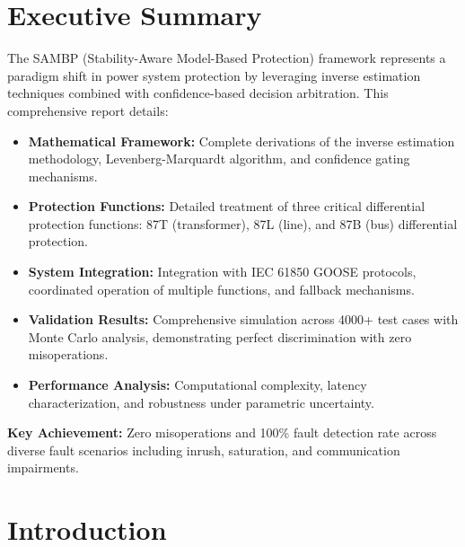 \documentclass[12pt,a4paper]{article}
\newcommand{\key}[1]{\textbf{\textcolor{blue!70!black}{#1}}}
\begin{document}

\section*{Executive Summary}

The SAMBP (Stability-Aware Model-Based Protection) framework represents a paradigm 
shift in power system protection by leveraging inverse estimation techniques combined 
with confidence-based decision arbitration. This comprehensive report details:

\begin{itemize}
    \item \textbf{Mathematical Framework:} Complete derivations of the inverse estimation 
    methodology, Levenberg-Marquardt algorithm, and confidence gating mechanisms.
    
    \item \textbf{Protection Functions:} Detailed treatment of three critical differential 
    protection functions: 87T (transformer), 87L (line), and 87B (bus) differential protection.
    
    \item \textbf{System Integration:} Integration with IEC 61850 GOOSE protocols, 
    coordinated operation of multiple functions, and fallback mechanisms.
    
    \item \textbf{Validation Results:} Comprehensive simulation across 4000+ test cases 
    with Monte Carlo analysis, demonstrating perfect discrimination with zero misoperations.
    
    \item \textbf{Performance Analysis:} Computational complexity, latency characterization, 
    and robustness under parametric uncertainty.
\end{itemize}

\key{Key Achievement:} Zero misoperations and 100\% fault detection rate across 
diverse fault scenarios including inrush, saturation, and communication impairments.

\newpage
\tableofcontents
\newpage
\listoffigures
\newpage
\listoftables
\newpage

\section{Introduction}
\label{sec:intro}
\end{document}
